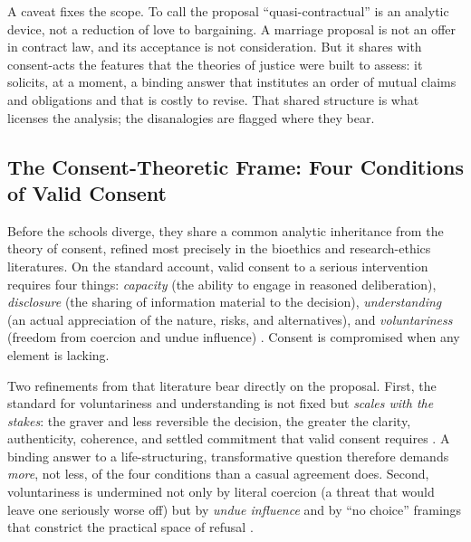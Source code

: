 \documentclass[11pt,a4paper]{article}
\begin{document}
A caveat fixes the scope. To call the proposal ``quasi-contractual'' is an analytic device, not a reduction of love to bargaining. A marriage proposal is not an offer in contract law, and its acceptance is not consideration. But it shares with consent-acts the features that the theories of justice were built to assess: it solicits, at a moment, a binding answer that institutes an order of mutual claims and obligations and that is costly to revise. That shared structure is what licenses the analysis; the disanalogies are flagged where they bear.

\subsection{The Consent-Theoretic Frame: Four Conditions of Valid Consent}\label{p06:sec:consent}

Before the schools diverge, they share a common analytic inheritance from the theory of consent, refined most precisely in the bioethics and research-ethics literatures. On the standard account, valid consent to a serious intervention requires four things: \emph{capacity} (the ability to engage in reasoned deliberation), \emph{disclosure} (the sharing of information material to the decision), \emph{understanding} (an actual appreciation of the nature, risks, and alternatives), and \emph{voluntariness} (freedom from coercion and undue influence) \parencite{eyal2019informed, beauchamp2019principles}. Consent is compromised when any element is lacking.

Two refinements from that literature bear directly on the proposal. First, the standard for voluntariness and understanding is not fixed but \emph{scales with the stakes}: the graver and less reversible the decision, the greater the clarity, authenticity, coherence, and settled commitment that valid consent requires \parencite{roberts2002voluntarism}. A binding answer to a life-structuring, transformative question therefore demands \emph{more}, not less, of the four conditions than a casual agreement does. Second, voluntariness is undermined not only by literal coercion (a threat that would leave one seriously worse off) but by \emph{undue influence} and by ``no choice'' framings that constrict the practical space of refusal \parencite{eyal2019informed}.
\end{document}
